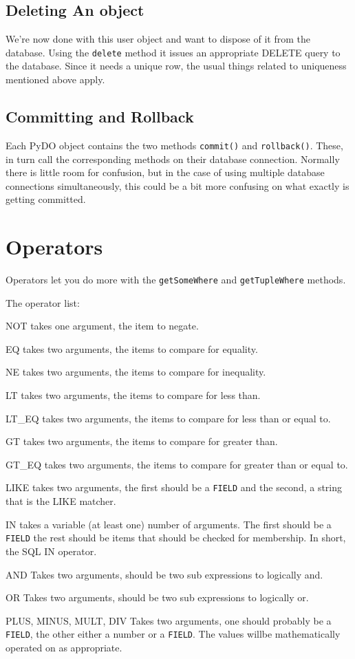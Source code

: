 \documentclass[titlepage]{manual}
\begin{document}
\section{Deleting An object}
We're now done with this user object and want to dispose of it from
the database.  Using the \texttt{delete} method it issues an
appropriate DELETE query to the database.  Since it needs a unique
row, the usual things related to uniqueness mentioned above apply.


\section{Committing and Rollback}
Each PyDO object contains the two methods \texttt{commit()} and
\texttt{rollback()}.  These, in turn call the corresponding methods on
their database connection.  Normally there is little room for
confusion, but in the case of using multiple database connections
simultaneously, this could be a bit more confusing on what exactly is
getting committed.

\chapter{Operators}
\label{operators}
Operators let you do more with the \texttt{getSomeWhere} and
\texttt{getTupleWhere} methods.

The operator list:
\begin{argdesc}
\item[NOT] takes one argument, the item to negate.
\item[EQ] takes two arguments, the items to compare for equality.
\item[NE]takes two arguments, the items to compare for inequality.
\item[LT ] takes two arguments, the items to compare for less than.
\item[LT_EQ]takes two arguments, the items to compare for less than or
equal to.
\item[GT]takes two arguments, the items to compare for greater than.
\item[GT_EQ]takes two arguments, the items to compare for greater than
or equal to.
\item[LIKE] takes two arguments, the first should be a \texttt{FIELD} and the second, a string that is the LIKE matcher.
\item[IN] takes a variable (at least one) number of arguments.  The
first should be a \texttt{FIELD} the rest should be items that should
be checked for membership.  In short, the SQL IN operator.
\item[AND] Takes two arguments, should be two sub expressions to
logically and.
\item[OR] Takes two arguments, should be two sub expressions to
logically or.
\item[PLUS, MINUS, MULT, DIV] Takes two arguments, one should probably be a
\texttt{FIELD}, the other either a number or a \texttt{FIELD}.  The values willbe mathematically operated on as appropriate.

\end{argdesc}
\end{document}
